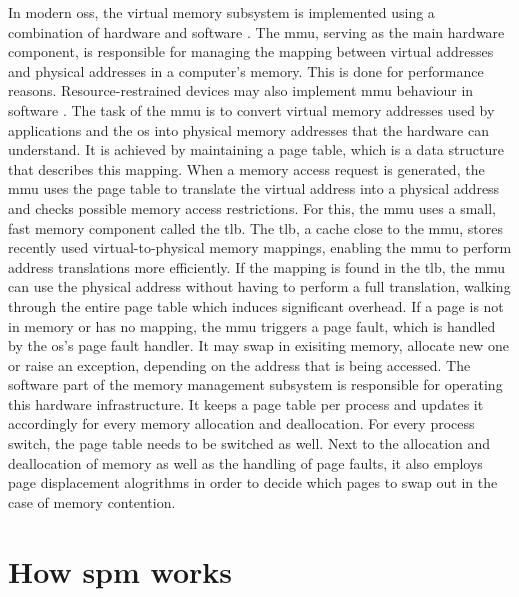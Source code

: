 In modern \acp{os}, the virtual memory subsystem is implemented using a combination of hardware and software \cite{mos2009}.
The \ac{mmu}, serving as the main hardware component, is responsible for managing the mapping between virtual addresses and physical addresses in a computer's memory.
This is done for performance reasons.
Resource-restrained devices may also implement \ac{mmu} behaviour in software \cite{sw-mmu2005}.
The task of the \ac{mmu} is to convert virtual memory addresses used by applications and the \ac{os} into physical memory addresses that the hardware can understand.
It is achieved by maintaining a page table, which is a data structure that describes this mapping.
When a memory access request is generated, the \ac{mmu} uses the page table to translate the virtual address into a physical address and checks possible memory access restrictions.
For this, the \ac{mmu} uses a small, fast memory component called the \ac{tlb}.
The \ac{tlb}, a cache close to the \ac{mmu}, stores recently used virtual-to-physical memory mappings, enabling the \ac{mmu} to perform address translations more efficiently.
If the mapping is found in the \ac{tlb}, the \ac{mmu} can use the physical address without having to perform a full translation, walking through the entire page table which induces significant overhead.
If a page is not in memory or has no mapping, the \ac{mmu} triggers a page fault, which is handled by the \ac{os}'s page fault handler.
It may swap in exisiting memory, allocate new one or raise an exception, depending on the address that is being accessed.
The software part of the memory management subsystem is responsible for operating this hardware infrastructure.
It keeps a page table per process and updates it accordingly for every memory allocation and deallocation.
For every process switch, the page table needs to be switched as well.
Next to the allocation and deallocation of memory as well as the handling of page faults, it also employs page displacement alogrithms in order to decide which pages to swap out in the case of memory contention.

\section{How \acs{spm} works}
\label{sec:how-spm-works}

